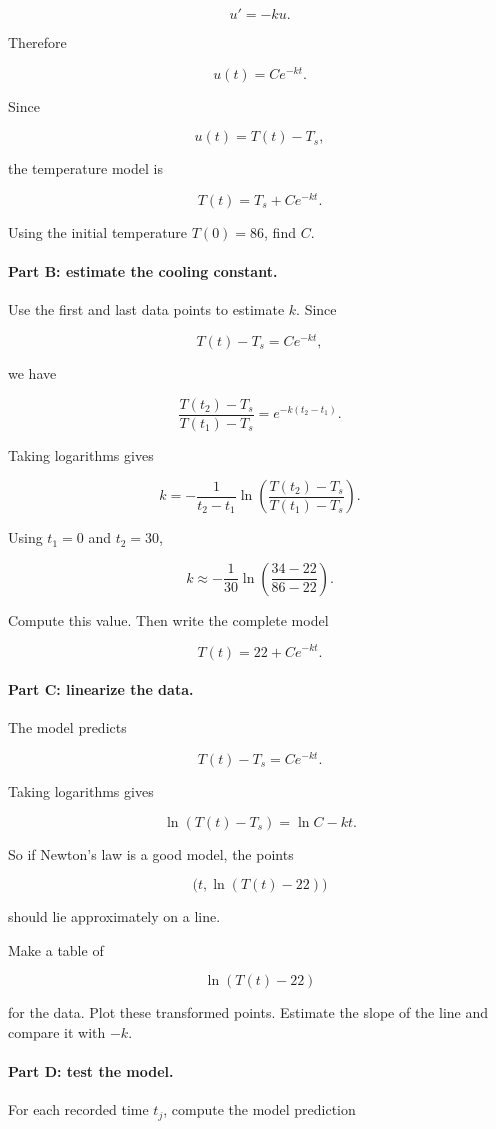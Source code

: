 \[
u'=-ku.
\]

Therefore

\[
u(t)=Ce^{-kt}.
\]

Since

\[
u(t)=T(t)-T_s,
\]

the temperature model is

\[
\boxed{
T(t)=T_s+Ce^{-kt}.
}
\]

Using the initial temperature \(T(0)=86\), find \(C\).

\paragraph{Part B: estimate the cooling constant.}
Use the first and last data points to estimate \(k\).  Since

\[
T(t)-T_s=Ce^{-kt},
\]

we have

\[
\frac{T(t_2)-T_s}{T(t_1)-T_s}
=
e^{-k(t_2-t_1)}.
\]

Taking logarithms gives

\[
\boxed{
k
=
-\frac{1}{t_2-t_1}
\ln
\left(
\frac{T(t_2)-T_s}{T(t_1)-T_s}
\right).
}
\]

Using \(t_1=0\) and \(t_2=30\),

\[
k
\approx
-\frac1{30}
\ln
\left(
\frac{34-22}{86-22}
\right).
\]

Compute this value.  Then write the complete model

\[
T(t)=22+Ce^{-kt}.
\]

\paragraph{Part C: linearize the data.}
The model predicts

\[
T(t)-T_s=Ce^{-kt}.
\]

Taking logarithms gives

\[
\boxed{
\ln(T(t)-T_s)=\ln C-kt.
}
\]

So if Newton's law is a good model, the points

\[
\bigl(t,\ln(T(t)-22)\bigr)
\]

should lie approximately on a line.

Make a table of

\[
\ln(T(t)-22)
\]

for the data.  Plot these transformed points.  Estimate the slope of the line and compare
it with \(-k\).

\paragraph{Part D: test the model.}
For each recorded time \(t_j\), compute the model prediction

